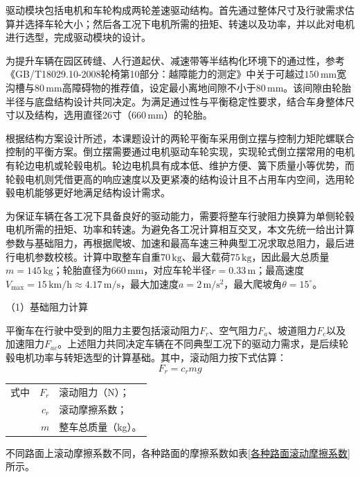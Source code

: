 驱动模块包括电机和车轮构成两轮差速驱动结构。首先通过整体尺寸及行驶需求估算并选择车轮大小；然后各工况下电机所需的扭矩、转速以及功率，并以此对电机进行选型，完成驱动模块的设计。

为提升车辆在园区砖缝、人行道起伏、减速带等半结构化环境下的通过性，参考《GB/T18029.10-2008轮椅第10部分：越障能力的测定》中关于可越过$150\,\mathrm{mm}$宽沟槽与$80\,\mathrm{mm}$高障碍物的推荐值，设定最小离地间隙不小于$80\,\mathrm{mm}$。该间隙由轮胎半径与底盘结构设计共同决定。为满足通过性与平衡稳定性要求，结合车身整体尺寸以及结构，选用直径26寸（$660\,\mathrm{mm}$）的轮胎。

根据结构方案设计所述，本课题设计的两轮平衡车采用倒立摆与控制力矩陀螺联合控制的平衡方案。倒立摆需要通过电机驱动车轮实现，实现轮式倒立摆常用的电机有轮边电机或轮毂电机。轮边电机具有成本低、维护方便、簧下质量小等优势，而轮毂电机则凭借更高的响应速度以及更紧凑的结构设计且不占用车内空间，选用轮毂电机能够更好地满足结构设计需求。

为保证车辆在各工况下具备良好的驱动能力，需要将整车行驶阻力换算为单侧轮毂电机所需的扭矩、功率和转速。为避免各工况计算相互交叉，本文先统一给出计算参数与基础阻力，再根据爬坡、加速和最高车速三种典型工况求取总阻力，最后进行电机参数校核。计算中取整车自重$70\,\mathrm{kg}$、最大载荷$75\,\mathrm{kg}$，因此最大总质量$m=145\,\mathrm{kg}$；轮胎直径为$660\,\mathrm{mm}$，对应车轮半径$r=0.33\,\mathrm{m}$；最高速度$V_{\max}=15\,\mathrm{km/h}\approx4.17\,\mathrm{m/s}$，最大加速度$a=2\,\mathrm{m/s^2}$，最大爬坡角$\theta=15^\circ$。

（1）基础阻力计算

平衡车在行驶中受到的阻力主要包括滚动阻力$F_r$、空气阻力$F_a$、坡道阻力$F_c$以及加速阻力$F_{ac}$。上述阻力共同决定车辆在不同典型工况下的驱动力需求，是后续轮毂电机功率与转矩选型的计算基础。其中，滚动阻力按下式估算：
\begin{equation}
F_r = c_r m g
\label{eq:ch2-fr}
\end{equation}
\begin{tabularx}{\textwidth}{@{}l@{\quad}r@{———}X@{}}
式中& $F_r$ & 滚动阻力（N）；\\
& $c_r$ & 滚动摩擦系数；\\
& $m$ & 整车总质量（kg）。\\
\end{tabularx}\vspace{3.15bp}

不同路面上滚动摩擦系数不同，各种路面的摩擦系数如表\ref{各种路面滚动摩擦系数}所示。


